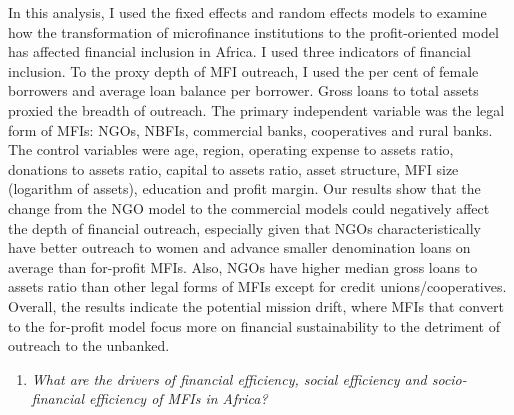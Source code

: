 \documentclass[a4paper, nobind]{templates/ociamthesis}
\providecommand{\tightlist}{%
  \setlength{\itemsep}{0pt}\setlength{\parskip}{0pt}}
\begin{document}
In this analysis, I used the fixed effects and random effects models to examine how the transformation of microfinance institutions to the profit-oriented model has affected financial inclusion in Africa. I used three indicators of financial inclusion. To the proxy depth of MFI outreach, I used the per cent of female borrowers and average loan balance per borrower. Gross loans to total assets proxied the breadth of outreach. The primary independent variable was the legal form of MFIs: NGOs, NBFIs, commercial banks, cooperatives and rural banks. The control variables were age, region, operating expense to assets ratio, donations to assets ratio, capital to assets ratio, asset structure, MFI size (logarithm of assets), education and profit margin. Our results show that the change from the NGO model to the commercial models could negatively affect the depth of financial outreach, especially given that NGOs characteristically have better outreach to women and advance smaller denomination loans on average than for-profit MFIs. Also, NGOs have higher median gross loans to assets ratio than other legal forms of MFIs except for credit unions/cooperatives. Overall, the results indicate the potential mission drift, where MFIs that convert to the for-profit model focus more on financial sustainability to the detriment of outreach to the unbanked.

\begin{enumerate}
\def\labelenumi{\arabic{enumi}.}
\setcounter{enumi}{2}
\tightlist
\item
  \emph{What are the drivers of financial efficiency, social efficiency and socio-financial efficiency of MFIs in Africa?}
\end{enumerate}
\end{document}
